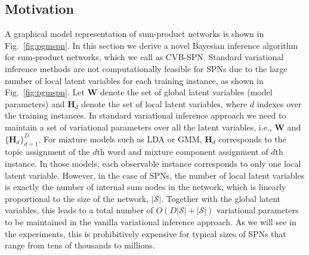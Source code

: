 \documentclass{article} %
\theoremstyle{definition}
\begin{document}
\subsection{Motivation}
A graphical model representation of sum-product networks is shown in Fig.~\ref{fig:pgmspn}. In this section we derive a novel Bayesian inference algorithm for sum-product networks, which we call as CVB-SPN. Standard variational inference methods are not computationally feasible for SPNs due to the large number of local latent variables for each training instance, as shown in Fig.~\ref{fig:pgmspn}. Let $\mathbf{W}$ denote the set of global latent variables (model parameters) and $\mathbf{H}_d$ denote the set of local latent variables, where $d$ indexes over the training instances. In standard variational inference approach we need to maintain a set of variational parameters over all the latent variables, i.e., $\mathbf{W}$ and $\{\mathbf{H}_d\}_{d=1}^D$. For mixture models such as LDA or GMM, $\mathbf{H}_d$ corresponds to the topic assignment of the $d$th word and mixture component assignment of $d$th instance. In those models, each observable instance corresponds to only one local latent variable. However,
in the case of SPNs, the number of local latent variables is exactly the number of internal sum nodes in the network, which is linearly proportional to the size of the network, $|\mathcal{S}|$. Together with the global latent variables, this leads to a total number of $O(D|\mathcal{S}| + |\mathcal{S}|)$ variational parameters to be maintained in the vanilla variational inference approach. As we will see in the experiments, this is prohibitively expensive for typical sizes of SPNs that range from tens of thousands to millions. 
\end{document}
